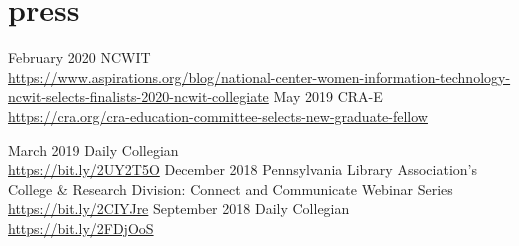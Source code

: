 \documentclass[]{cv-style}          %
\begin{document}
\vspace{-0.2cm}
\section{press}
\begin{entrylist}
\entry
    {February 2020}
  {NCWIT}
  {}
  {\\
    \url{https://www.aspirations.org/blog/national-center-women-information-technology-ncwit-selects-finalists-2020-ncwit-collegiate}}
\entry
    {May 2019}
  {CRA-E}
  {}
  {\\
    \url{https://cra.org/cra-education-committee-selects-new-graduate-fellow}}

\entry
    {March 2019}
  {Daily Collegian}
  {}
  {\\
    \url{https://bit.ly/2UY2T5O}}
\entry
    {December 2018}
  {Pennsylvania Library Association’s College \& Research Division: Connect and Communicate Webinar Series}
  {}
  {\\
    \url{https://bit.ly/2CIYJre}}
\entry
    {September 2018}
  {Daily Collegian}
  {}
  {\\
 \url{https://bit.ly/2FDjOoS}}

\end{entrylist}

\end{document}
